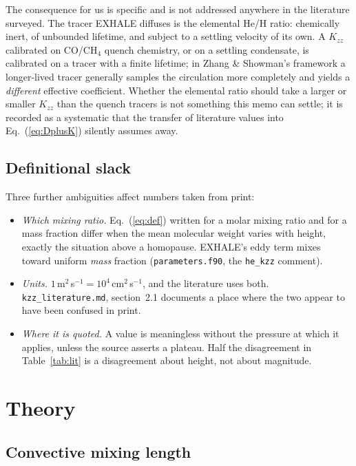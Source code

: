 \documentclass[english,a4paper]{my_memo}
\begin{document}
The consequence for us is specific and is not addressed anywhere in the
literature surveyed. The tracer EXHALE diffuses is the elemental He/H ratio:
chemically inert, of unbounded lifetime, and subject to a settling velocity
of its own. A $K_{zz}$ calibrated on CO/CH$_4$ quench chemistry, or on a
settling condensate, is calibrated on a tracer with a finite lifetime; in
Zhang \& Showman's framework a longer-lived tracer generally samples the
circulation more completely and yields a \emph{different} effective
coefficient. Whether the elemental ratio should take a larger or smaller
$K_{zz}$ than the quench tracers is not something this memo can settle;
it is recorded as a systematic that the transfer of literature values into
Eq.~(\ref{eq:DplusK}) silently assumes away.

\subsection{Definitional slack}

Three further ambiguities affect numbers taken from print:
%
\begin{itemize}
\item \emph{Which mixing ratio.} Eq.~(\ref{eq:def}) written for a molar
      mixing ratio and for a mass fraction differ when the mean molecular
      weight varies with height, exactly the situation above a homopause.
      EXHALE's eddy term mixes toward uniform \emph{mass} fraction
      (\texttt{parameters.f90}, the \texttt{he\_kzz} comment).
\item \emph{Units.} $1$\,m$^{2}$\,s$^{-1} = 10^{4}$\,cm$^{2}$\,s$^{-1}$, and
      the literature uses both. \texttt{kzz\_literature.md}, section~2.1
      documents a place where the two appear to have been confused in print.
\item \emph{Where it is quoted.} A value is meaningless without the pressure
      at which it applies, unless the source asserts a plateau. Half the
      disagreement in Table~\ref{tab:lit} is a disagreement about height,
      not about magnitude.
\end{itemize}

\section{Theory}
\label{sec:theory}

\subsection{Convective mixing length}
\label{sec:ml}
\end{document}
